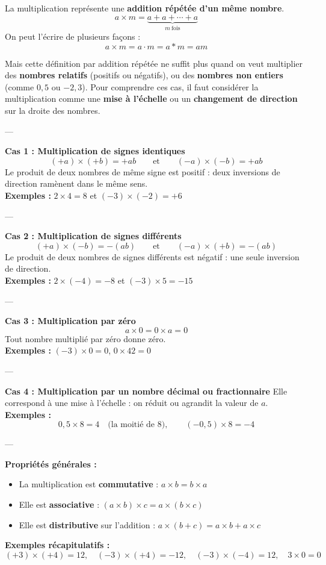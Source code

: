 \documentclass[11pt,a4paper]{article}
\newcommand{\rulebox}[3]{
\begin{tcolorbox}[colback=#1!10!white,colframe=#1!60!black,title=\textbf{#2}]
#3
\end{tcolorbox}
}
\begin{document}
\rulebox{blue}{Définition d’une multiplication}{
La multiplication représente une \textbf{addition répétée d’un même nombre}.\\[0.2cm]
\[
a \times m = \underbrace{a + a + \cdots + a}_{m\ \text{fois}}
\]
On peut l’écrire de plusieurs façons :
\[
a \times m = a\cdot m = a*m = am
\]

Mais cette définition par addition répétée ne suffit plus quand on veut multiplier des \textbf{nombres relatifs} (positifs ou négatifs), ou des \textbf{nombres non entiers} (comme $0{,}5$ ou $-2{,}3$).  
Pour comprendre ces cas, il faut considérer la multiplication comme une \textbf{mise à l’échelle} ou un \textbf{changement de direction} sur la droite des nombres.

---

\textbf{Cas 1 : Multiplication de signes identiques}  
\[
(+a)\times(+b)=+ab \qquad\text{et}\qquad (-a)\times(-b)=+ab
\]
Le produit de deux nombres de même signe est positif : deux inversions de direction ramènent dans le même sens.\\[0.2cm]
\textbf{Exemples : } $2\times4=8$ \quad et \quad $(-3)\times(-2)=+6$

---

\textbf{Cas 2 : Multiplication de signes différents}  
\[
(+a)\times(-b)=-(ab) \qquad\text{et}\qquad (-a)\times(+b)=-(ab)
\]
Le produit de deux nombres de signes différents est négatif : une seule inversion de direction.\\[0.2cm]
\textbf{Exemples : } $2\times(-4)=-8$ \quad et \quad $(-3)\times5=-15$

---

\textbf{Cas 3 : Multiplication par zéro}  
\[
a\times0=0\times a=0
\]
Tout nombre multiplié par zéro donne zéro.\\[0.2cm]
\textbf{Exemples : } $(-3)\times0=0$, \quad $0\times42=0$

---

\textbf{Cas 4 : Multiplication par un nombre décimal ou fractionnaire}  
Elle correspond à une mise à l’échelle : on réduit ou agrandit la valeur de $a$.\\[0.2cm]
\textbf{Exemples : } 
\[
0{,}5\times8=4 \quad\text{(la moitié de 8)}, \qquad (-0{,}5)\times8=-4
\]

---

\textbf{Propriétés générales :}
\begin{itemize}
\item La multiplication est \textbf{commutative} : $a\times b = b\times a$
\item Elle est \textbf{associative} : $(a\times b)\times c = a\times(b\times c)$
\item Elle est \textbf{distributive} sur l’addition : $a\times(b+c)=a\times b + a\times c$
\end{itemize}

\textbf{Exemples récapitulatifs :}\\[0.1cm]
\[
(+3)\times(+4)=12, \quad (-3)\times(+4)=-12, \quad (-3)\times(-4)=12, \quad 3\times0=0
\]
}
\end{document}
